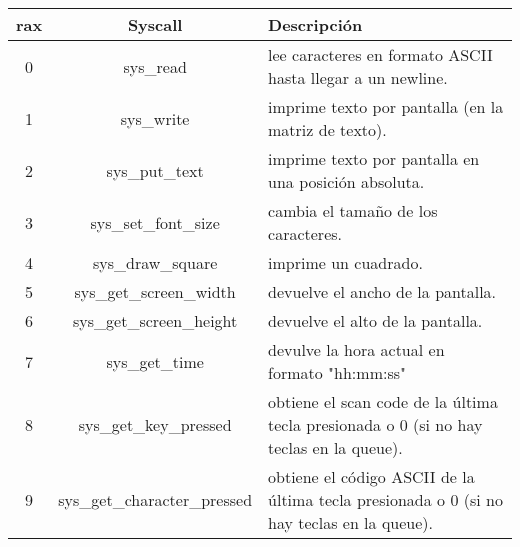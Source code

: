 \documentclass{article}
\begin{document}
\begin{center}
\begin{tabular}{|c|c|l|}
\hline
\textbf{rax} & \textbf{Syscall} & \textbf{Descripción} \\ \hline
0 & sys\_read & \begin{minipage}{80mm}lee caracteres en formato ASCII hasta llegar a un newline.\end{minipage} \\ \hline
1 & sys\_write &  \begin{minipage}{80mm}imprime texto por pantalla (en la matriz de texto).\end{minipage} \\ \hline
2 & sys\_put\_text &  \begin{minipage}{80mm}imprime texto por pantalla en una posición absoluta.\end{minipage} \\ \hline
3 & sys\_set\_font\_size &  \begin{minipage}{80mm}cambia el tamaño de los caracteres.\end{minipage} \\ \hline
4 & sys\_draw\_square &  \begin{minipage}{80mm}imprime un cuadrado.\end{minipage} \\ \hline
5 & sys\_get\_screen\_width &  \begin{minipage}{80mm}devuelve el ancho de la pantalla.\end{minipage} \\ \hline
6 & sys\_get\_screen\_height &  \begin{minipage}{80mm}devuelve el alto de la pantalla.\end{minipage} \\ \hline
7 & sys\_get\_time &  \begin{minipage}{80mm}devulve la hora actual en formato "hh:mm:ss"\end{minipage} \\ \hline
8 & sys\_get\_key\_pressed &  \begin{minipage}{80mm}obtiene el scan code de la última tecla presionada o 0 (si no hay teclas en la queue).\end{minipage} \\ \hline
9 & sys\_get\_character\_pressed &  \begin{minipage}{80mm}obtiene el código ASCII de la última tecla presionada o 0 (si no hay teclas en la queue).\end{minipage} \\ \hline

\end{tabular}
\end{center}
\end{document}
